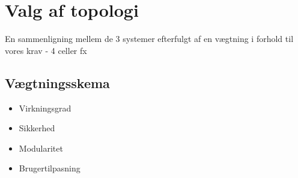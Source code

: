 \section{Valg af topologi}
En sammenligning mellem de 3 systemer efterfulgt af en vægtning i forhold til vores krav - 4 celler fx
\subsection{Vægtningsskema}

\begin{itemize}
	\item Virkningsgrad
	\item Sikkerhed
	\item Modularitet
	\item Brugertilpasning
\end{itemize}